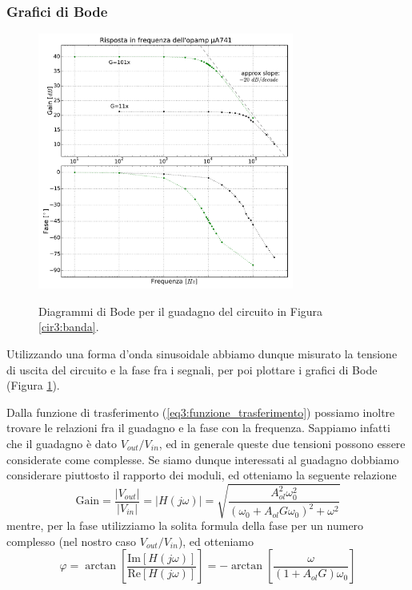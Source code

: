 \subsubsection*{Grafici di Bode}

\begin{figure}[ht]
 \centering
   {\includegraphics[width=0.75\textwidth]{../E03/latex/bode.pdf}}
 \caption{Diagrammi di Bode per il guadagno del circuito in Figura \ref{cir3:banda}.}
 \label{gr3:bode}
\end{figure}

Utilizzando una forma d'onda sinusoidale abbiamo dunque misurato la tensione di uscita del circuito e la fase fra i segnali, per poi plottare i grafici di Bode (Figura \ref{gr3:bode}).

Dalla funzione di trasferimento (\ref{eq3:funzione_trasferimento}) possiamo inoltre trovare le relazioni fra il guadagno e la fase con la frequenza. Sappiamo infatti che il guadagno è dato $V_{out}/V_{in}$, ed in generale queste due tensioni possono essere considerate come complesse. Se siamo dunque interessati al guadagno dobbiamo considerare piuttosto il rapporto dei moduli, ed otteniamo la seguente relazione
\begin{equation}
\mathrm{Gain}=\frac{|V_{out}|}{|V_{in}|}=|H(j\omega)|=\sqrt{\frac{A_{ol}^2 \omega_0^2}{(\omega_0 + A_{ol} G \omega_0)^2 + \omega^2}}
\label{eq3:fit_gain}
\end{equation}
mentre, per la fase utilizziamo la solita formula della fase per un numero complesso (nel nostro caso $V_{out}/V_{in}$), ed otteniamo
\begin{equation}
\varphi=\arctan\left[{\frac{\mathrm{Im}[H(j\omega)]}{\mathrm{Re}[H(j\omega)]}}\right]= - \arctan\left[\frac{\omega}{(1+A_{ol}G)\omega_0}\right]
\label{eq3:fit_fase}
\end{equation}

